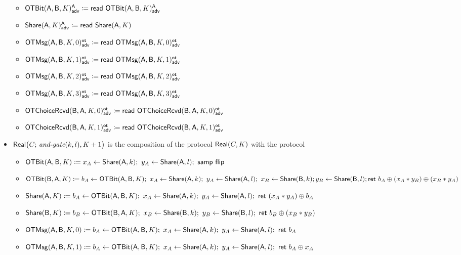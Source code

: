 \begin{itemize}
\begin{itemize}
\item {\color{blue} $\LeakOTBit(\A,\B,K)^\A_\adv \coloneqq \read{\LeakOTBit(\A,\B,K)^\A_\adv}$}
\item {\color{blue} $\LeakShare(\A,K)^\A_\adv \coloneqq \read{\Share(\A,K)}$}\medskip
\item {\color{blue} $\LeakOTMsg(\A,\B,K,0)^\ot_\adv \coloneqq \read{\LeakOTMsg(\A,\B,K,0)^\ot_\adv}$}
\item {\color{blue} $\LeakOTMsg(\A,\B,K,1)^\ot_\adv \coloneqq \read{\LeakOTMsg(\A,\B,K,1)^\ot_\adv}$}
\item {\color{blue} $\LeakOTMsg(\A,\B,K,2)^\ot_\adv \coloneqq \read{\LeakOTMsg(\A,\B,K,2)^\ot_\adv}$}
\item {\color{blue} $\LeakOTMsg(\A,\B,K,3)^\ot_\adv \coloneqq \read{\LeakOTMsg(\A,\B,K,3)^\ot_\adv}$}\medskip
\item {\color{blue} $\LeakOTChoiceRcvd(\B,\A,K,0)^\ot_\adv \coloneqq \read{\LeakOTChoiceRcvd(\B,\A,K,0)^\ot_\adv}$}
\item {\color{blue} $\LeakOTChoiceRcvd(\B,\A,K,1)^\ot_\adv \coloneqq \read{\LeakOTChoiceRcvd(\B,\A,K,1)^\ot_\adv}$}
\end{itemize}
\item $\Real\big(C; \, \andgate(k,l),K+1\big)$ is the composition of the protocol $\Real(C,K)$ with the protocol
\begin{itemize}
\item $\OTBit(\A,\B,K) \coloneqq x_A \leftarrow \Share(\A,k); \ y_A \leftarrow \Share(\A,l); \ \samp{\flip}$
\item $\OTBit(\B,\A,K) \coloneqq b_A \leftarrow \OTBit(\A,\B,K); \ x_A \leftarrow \Share(\A,k); \ y_A \leftarrow \Share(\A,l); \ x_B \leftarrow \Share(\B,k); \\ y_B \leftarrow \Share(\B,l); \ret{b_A \oplus (x_A * y_B) \oplus (x_B * y_A)}$\smallskip
\item $\Share(\A,K) \coloneqq b_A \leftarrow \OTBit(\A,\B,K); \ x_A \leftarrow \Share(\A,k); \ y_A \leftarrow \Share(\A,l); \ \ret{(x_A * y_A) \oplus b_A}$
\item $\Share(\B,K) \coloneqq b_B \leftarrow \OTBit(\B,\A,K); \ x_B \leftarrow \Share(\B,k); \ y_B \leftarrow \Share(\B,l); \ \ret{b_B \oplus (x_B * y_B)}$\smallskip
\item $\OTMsg(\A,\B,K,0) \coloneqq b_A \leftarrow \OTBit(\A,\B,K); \ x_A \leftarrow \Share(\A,k); \ y_A \leftarrow \Share(\A,l); \ \ret{b_A}$
\item $\OTMsg(\A,\B,K,1) \coloneqq b_A \leftarrow \OTBit(\A,\B,K); \ x_A \leftarrow \Share(\A,k); \ y_A \leftarrow \Share(\A,l); \ \ret{b_A \oplus x_A}$

\end{itemize}
\end{itemize}
